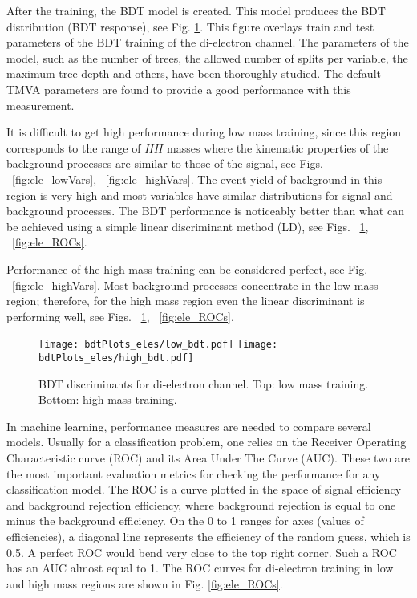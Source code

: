 After the training, the BDT model is created. This model produces the BDT distribution (BDT response), see Fig. \ref{fig:ele_BDTs}. This figure overlays train and test parameters of the BDT training of the di-electron channel. The parameters of the model, such as the number of trees, the allowed number of splits per variable, the maximum tree depth and others, have been thoroughly studied. The default TMVA parameters are found to provide a good performance with this measurement. 

It is difficult to get high performance during low mass training, since
this region corresponds to the range of $HH$ masses where the kinematic properties of the background processes are similar to those of the signal, see Figs. ~\ref{fig:ele_lowVars}, ~\ref{fig:ele_highVars}. The event yield of background in this region is very high and most variables have similar distributions for signal and background processes. The BDT performance is noticeably better than what can be achieved using a simple linear discriminant method (LD), see Figs. ~\ref{fig:ele_BDTs}, ~\ref{fig:ele_ROCs}.

Performance of the high mass training can be considered perfect, see Fig. ~\ref{fig:ele_highVars}. Most background processes concentrate in the low mass region; therefore, for the high mass region even the linear
discriminant is performing well, see Figs. ~\ref{fig:ele_BDTs}, ~\ref{fig:ele_ROCs}.

\begin{figure}[H]
\begin{center}
\texttt{[image: bdtPlots\_eles/low\_bdt.pdf]}
\texttt{[image: bdtPlots\_eles/high\_bdt.pdf]}
\caption[BDT discriminants for di-electron channel.]{ BDT discriminants for di-electron channel. Top: low mass training. Bottom: high mass training. }
\label{fig:ele_BDTs}
\end{center}
\end{figure}

In machine learning, performance measures are needed to compare several models. Usually for a classification problem, one relies on the Receiver Operating Characteristic curve (ROC) and its Area Under The Curve (AUC). These two are the most important evaluation metrics for checking the performance for any classification model. The ROC is a curve plotted in the space of signal efficiency and background rejection efficiency, where background rejection is equal to one minus the background efficiency. On the 0 to 1 ranges for axes (values of efficiencies), a diagonal line represents the efficiency of the random guess, which is 0.5. A perfect ROC would bend very close to the top right corner. Such a ROC has an AUC almost equal to 1. The ROC curves for di-electron training in low and high mass regions are shown in Fig. \ref{fig:ele_ROCs}. 

